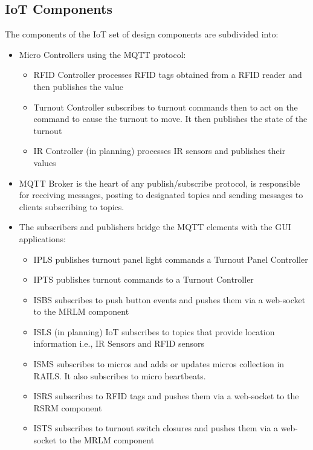 \subsection{\ac{IoT} Components}
The components of the \ac{IoT} set of design components are subdivided into:
\begin{itemize}
  \item Micro Controllers using the \ac{MQTT} protocol:
\begin{itemize}
  \item \ac{RFID} Controller processes \ac{RFID} tags obtained from a \ac{RFID} reader and then publishes the value
  \item Turnout Controller subscribes to turnout commands then to act on the command to cause the turnout to move. It then publishes the state of the turnout
  \item \ac{IR} Controller (in planning) processes \ac{IR} sensors and publishes their values
\end{itemize}
  \item \ac{MQTT} Broker is the heart of any publish/subscribe protocol, is responsible for receiving messages, posting to designated topics and sending messages to clients subscribing to topics.
  \item The subscribers and publishers bridge the \ac{MQTT} elements with the \ac{GUI} applications:
\begin{itemize}
  \item \ac{IPLS} publishes turnout panel light commands a Turnout Panel Controller
  \item \ac{IPTS} publishes turnout commands to a Turnout Controller
  \item \ac{ISBS}  subscribes to push button events and pushes them via a web-socket to the MRLM component
  \item \ac{ISLS} (in planning) \ac{IoT} subscribes to topics that provide location information i.e., \ac{IR} Sensors and \ac{RFID} sensors
  \item \ac{ISMS} subscribes to micros and adds or updates micros collection in RAILS. It also subscribes to micro heartbeats.
  \item \ac{ISRS} subscribes to \ac{RFID} tags and pushes them via a web-socket to the \ac{RSRM} component
  \item \ac{ISTS} subscribes to turnout switch closures and pushes them via a web-socket to the \ac{MRLM} component
\end{itemize}
\end{itemize}
